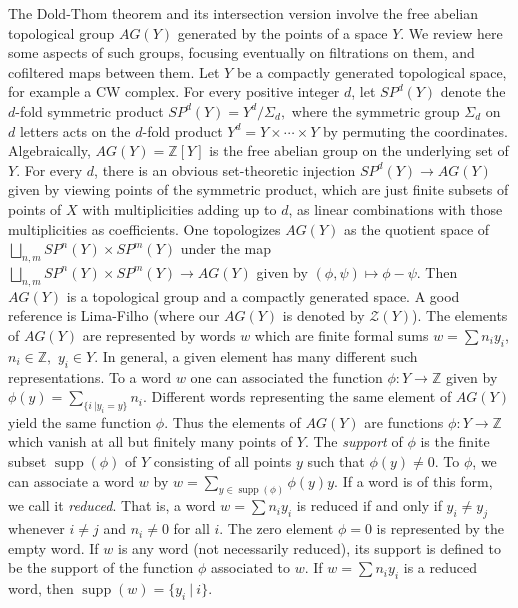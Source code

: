 \documentclass{amsart}
\theoremstyle{definition}
\theoremstyle{remark}
\newcommand {\Za}    {\ensuremath{\mathcal{Z}}}
\newcommand {\intg}  {\ensuremath{\mathbb{Z}}}
\newcommand {\supp}  {\ensuremath{\operatorname{supp}}}
\begin{document}
The Dold-Thom theorem and its intersection version involve the
free abelian topological group $AG(Y)$ generated by the points of a space $Y$.
We review here some aspects of such groups, focusing eventually
on filtrations on them, and cofiltered maps between them.
Let $Y$ be a compactly generated topological space, for example a CW complex.
For every positive integer $d$, let $SP^d (Y)$ denote the
$d$-fold symmetric product 
$SP^d (Y) = Y^d / \Sigma_d,$ where the symmetric group
$\Sigma_d$ on $d$ letters acts on the $d$-fold product 
$Y^d = Y\times \cdots \times Y$ by permuting the coordinates.
Algebraically, $AG (Y) = \intg [Y]$
is the free abelian group on the underlying set of $Y$.
For every $d$, there is an obvious set-theoretic injection
$SP^d (Y) \to AG (Y)$ given by viewing points of the symmetric product,
which are just finite subsets of points of $X$ with multiplicities
adding up to $d$, as linear combinations
with those multiplicities as coefficients.
One topologizes $AG (Y)$ as the quotient space of
$\bigsqcup_{n,m} SP^n (Y) \times SP^m (Y)$
under the map
$\bigsqcup_{n,m} SP^n (Y) \times SP^m (Y) \to AG (Y)$
given by $(\phi, \psi) \mapsto \phi-\psi$.
Then $AG (Y)$ is a topological group and a compactly generated space.
A good reference is Lima-Filho \cite[Section 2.1]{limafilhogspaces}
(where our $AG(Y)$ is denoted by $\Za (Y)$).
The elements of $AG(Y)$ are represented by words $w$ which are finite formal sums
$w=\sum n_i y_i$, $n_i \in \intg,$ $y_i \in Y$.
In general, a given element has many different such representations.
To a word $w$ one can associated the function $\phi: Y \to \intg$
given by
$\phi (y) = \sum_{\{ i ~| y_i = y \}} n_i.$
Different words representing the same element of $AG(Y)$ yield the same function $\phi$.
Thus the elements of $AG(Y)$ are functions $\phi: Y \to \intg$ which vanish
at all but finitely many points of $Y$.
The \emph{support} of $\phi$ is the finite subset $\supp (\phi)$ of $Y$ consisting of all
points $y$ such that $\phi (y) \not= 0$.
To $\phi$, we can associate a word $w$ by
$w = \sum_{y\in \supp (\phi)} \phi (y) y.$
If a word is of this form, we call it \emph{reduced}.
That is, a word $w=\sum n_i y_i$ is reduced if and only if
$y_i \not= y_j$ whenever $i\not= j$ and $n_i \not= 0$ for all $i$.
The zero element $\phi =0$ is represented by the empty word.
If $w$ is any word (not necessarily reduced), its support is defined to 
be the support of the function $\phi$ associated to $w$.
If $w=\sum n_i y_i$ is a reduced word, then
$\supp (w) = \{ y_i ~|~ i \}.$
\end{document}
